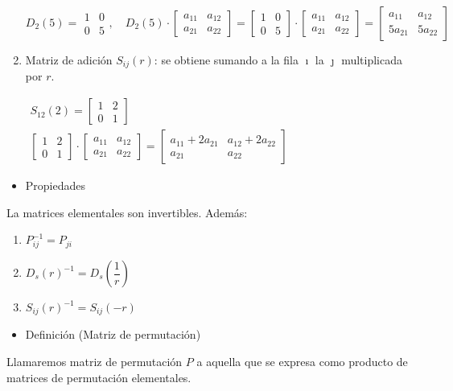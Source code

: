 \begin{enumerate}[label=\color{lightblue}\arabic*)]
	$D_2(5)=\begin{array}{cc}
		1 & 0 \\
		0 & 5
	\end{array},\quad D_2(5)\cdot\begin{bmatrix}
	a_{11} & a_{12}\\
	a_{21} & a_{22}
	\end{bmatrix}=\begin{bmatrix}
	1 & 0 \\
	0 & 5
	\end{bmatrix}\cdot\begin{bmatrix}
	a_{11} & a_{12}\\
	a_{21} & a_{22}
	\end{bmatrix}=\begin{bmatrix}
	a_{11} & a_{12}\\
	5a_{21} & 5a_{22}
	\end{bmatrix}$
	\item Matriz de adición $S_{ij}(r)$: se obtiene sumando a la fila $\imath$ la $\jmath$ multiplicada por $r$.
	
	\Ej
	
	$\begin{array}{l}
		S_{12}(2)=\begin{bmatrix}
			1 & 2 \\
			0 & 1
		\end{bmatrix}\\
		\begin{bmatrix}
			1 & 2 \\
			0 & 1
		\end{bmatrix}\cdot\begin{bmatrix}
		a_{11} & a_{12}\\
		a_{21} & a_{22}
		\end{bmatrix}=\begin{bmatrix}
		a_{11}+2a_{21} & a_{12}+2a_{22}\\
		a_{21} & a_{22}
		\end{bmatrix}
	\end{array}$
\end{enumerate}
\begin{itemize}[label=\color{red}\textbullet, leftmargin=*]
	\item \color{lightblue}Propiedades
\end{itemize}
La matrices elementales son invertibles. Además:
\begin{enumerate}[label=\color{lightblue}\arabic*)]
	\item $P_{ij}^{-1}=P_{ji}$
	\item $D_s(r)^{-1}=D_s\left(\dfrac{1}{r}\right)$
	\item $S_{ij}(r)^{-1}=S_{ij}(-r)$
\end{enumerate}
\begin{itemize}[label=\color{red}\textbullet, leftmargin=*]
	\item \color{lightblue}Definición (Matriz de permutación)
\end{itemize}
Llamaremos matriz de permutación $P$ a aquella que se expresa como producto de matrices de permutación elementales.

